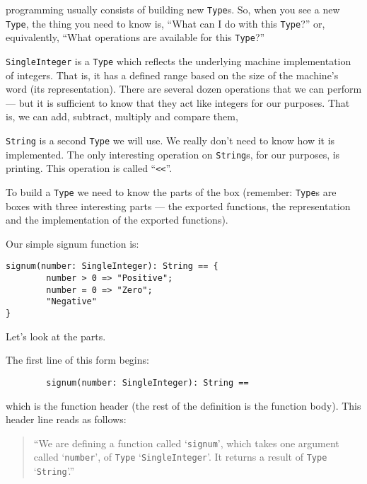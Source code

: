 \asharp{} programming usually consists of building new \verb"Type"s. 
So, when you see a new \verb"Type", the thing you need to know is,
``What can I do with this \verb"Type"?'' or, equivalently, 
``What operations are available for this \verb"Type"?''

\verb"SingleInteger" is a \verb"Type" which reflects the underlying machine
implementation of integers. That is, it has a defined range based on
the size of the machine's word (its representation).  There are several
dozen operations that we can perform --- but it is sufficient to know
that they act like integers for our purposes. That is, we can add,
subtract, multiply and compare them, \etc{}

\verb"String" is a second \verb"Type" we will use. We really don't need to know how
it is implemented. The only interesting operation on \verb"String"s,
for our purposes, is printing. This operation is called ``\verb+<<+''.

To build a \verb"Type" we need to know the parts of the box (remember: \verb"Type"s
are boxes with three interesting parts --- the exported functions, the 
representation and the implementation of the exported functions).

Our simple signum function is:

\begin{small}
\begin{verbatim}
signum(number: SingleInteger): String == {
        number > 0 => "Positive"; 
        number = 0 => "Zero";
        "Negative"
}
\end{verbatim}
\end{small}
Let's look at the parts.

The first line of this form begins:

\begin{small}
\begin{verbatim} 
        signum(number: SingleInteger): String ==
\end{verbatim}
\end{small}

which is the function header (the rest of the definition
is the function body). This header line reads as follows:
\begin{quotation}
  ``We are defining a function called `\verb"signum"',
   which takes one argument called `\verb"number"', of \verb"Type"
   `\verb"SingleInteger"'. It returns a result
   of \verb"Type" `\verb"String"'.''
\end{quotation}

